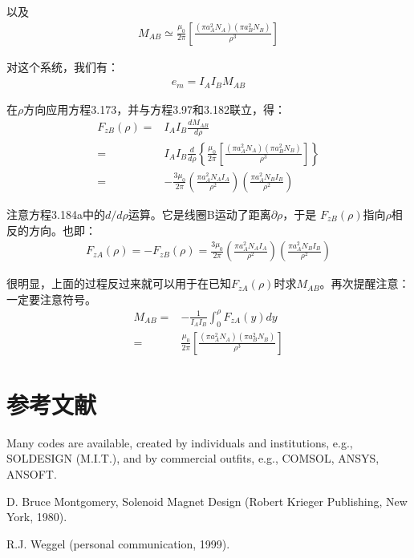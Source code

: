 以及
\begin{align*}%
M_{AB}\simeq\frac{\mu_0}{2\pi}\left[\frac{(\pi a_{A}^{2}N_A)(\pi a_{B}^{2}N_B)}{\rho^3}\right] \tag{3.97}
\end{align*}

对这个系统，我们有：
\begin{align}%
e_m=I_AI_BM_{AB}
\end{align}

在$\rho$方向应用方程3.173，并与方程3.97和3.182联立，得：
\begin{subequations}%
	\begin{align}
F_{zB}(\rho)=&I_A I_B\frac{dM_{AB}}{d\rho}\\
=&I_A I_B\frac{d}{d\rho}\left\{\frac{\mu_0}{2\pi}\left[\frac{(\pi a_{A}^{2}N_A)(\pi a_{B}^{2}N_B)}{\rho^3}\right]\right\}\\
=&-\frac{3\mu_0}{2\pi}\left(\frac{\pi a_{A}^{2}N_A I_A}{\rho^2}\right)\left(\frac{\pi a_{A}^{2}N_B I_B}{\rho^2}\right)
	\end{align}
\end{subequations}

注意方程3.184a中的$d/d\rho$运算。它是线圈B运动了距离$\partial\rho$，于是
$F_{zB}(\rho)$指向$\rho$相反的方向。也即：
\begin{align*}%
F_{zA}(\rho)=-F_{zB}(\rho)
=\frac{3\mu_0}{2\pi}\left(\frac{\pi a_{A}^{2}N_A I_A}{\rho^2}\right)\left(\frac{\pi a_{A}^{2}N_B I_B}{\rho^2}\right)\tag{3.39c}
\end{align*}

很明显，上面的过程反过来就可以用于在已知$F_{zA}(\rho)$时求$M_{AB}$。再次提醒注意：一定要注意符号。
\begin{align*}%
M_{AB}=&-\frac{1}{I_AI_B}\int_{0}^{\rho}F_{zA}(y)dy\tag{3.185}\\
=&\frac{\mu_0}{2\pi}\left[\frac{(\pi a_{A}^{2}N_A)(\pi a_{B}^{2}N_B)}{\rho^3}\right]\tag{3.97}
\end{align*}

\section*{参考文献}
\noindent [3.1] Many codes are available, created by individuals and institutions, e.g., SOLDESIGN (M.I.T.), and by commercial outfits, e.g., COMSOL, ANSYS, ANSOFT.

\noindent [3.2] D. Bruce Montgomery, Solenoid Magnet Design (Robert Krieger Publishing, New
York, 1980).

\noindent [3.3] R.J. Weggel (personal communication, 1999).

